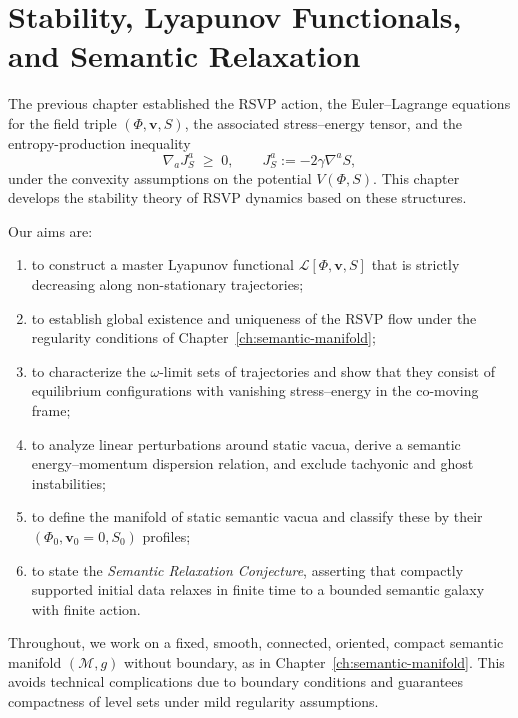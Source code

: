 \chapter{Stability, Lyapunov Functionals, and Semantic Relaxation}
\label{ch:rsvp-stability}

The previous chapter established the RSVP action, the Euler--Lagrange equations
for the field triple $(\Phi,\mathbf{v},S)$, the associated stress--energy tensor,
and the entropy-production inequality
\begin{equation}
\label{eq:entropy-inequality-ch3}
\nabla_a J_S^a \;\ge\; 0,
\qquad
J_S^a := - 2\gamma \nabla^a S,
\end{equation}
under the convexity assumptions on the potential $V(\Phi,S)$.
This chapter develops the stability theory of RSVP dynamics based on these
structures.

Our aims are:

\begin{enumerate}
  \item to construct a master Lyapunov functional
        $\mathscr{L}[\Phi,\mathbf{v},S]$ that is strictly decreasing along
        non-stationary trajectories;
  \item to establish global existence and uniqueness of the RSVP flow under the
        regularity conditions of Chapter~\ref{ch:semantic-manifold};
  \item to characterize the $\omega$-limit sets of trajectories and show that
        they consist of equilibrium configurations with vanishing stress--energy
        in the co-moving frame;
  \item to analyze linear perturbations around static vacua, derive a semantic
        energy--momentum dispersion relation, and exclude tachyonic and ghost
        instabilities;
  \item to define the manifold of static semantic vacua and classify these by
        their $(\Phi_0,\mathbf{v}_0=0,S_0)$ profiles;
  \item to state the \emph{Semantic Relaxation Conjecture}, asserting that
        compactly supported initial data relaxes in finite time to a bounded
        semantic galaxy with finite action.
\end{enumerate}

Throughout, we work on a fixed, smooth, connected, oriented, compact semantic
manifold $(\mathcal{M},g)$ without boundary, as in
Chapter~\ref{ch:semantic-manifold}. This avoids technical complications due to
boundary conditions and guarantees compactness of level sets under mild
regularity assumptions.

